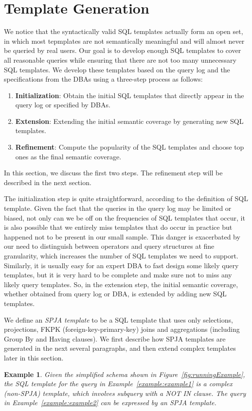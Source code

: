 \documentclass{vldb}
\newtheorem{example}{Example}
\begin{document}
\section{Template Generation}
\label{sec:offline}
We notice that the syntactically valid SQL templates actually form an open set, in which most tepmplates are not semantically meaningful and will almost never be queried by real users.  Our goal is to develop enough SQL templates to cover all reasonable queries while ensuring that there are not too many unnecessary SQL templates.  We develop these templates based on the query log and the specifications from the DBAs using a three-step process as follows: 
\begin{enumerate}  
\item \textbf{Initialization}: Obtain the initial SQL templates that directly appear in the query log or specified by DBAs.  
\item \textbf{Extension}: Extending the initial semantic coverage by generating new SQL templates.  
\item \textbf{Refinement}: Compute the popularity of the SQL templates and choose top ones as the final semantic coverage.\end{enumerate}
In this section, we discuss the first two steps.  The refinement step will be described in the next section.

The initialization step is quite straightforward, according to the definition of SQL template.  Given the fact that the queries in the query log may be limited or biased, not only can we be off on the frequencies of SQL templates that occur, it is also possible that we entirely miss templates that do occur in practice but happened not to be present in our small sample. This danger is exacerbated by our need to distinguish between operators and query structures at fine granularity, which increases the number of SQL templates we need to support. Similarly, it is usually easy for an expert DBA to fast design some likely query templates, but it is very hard to be complete and make sure not to miss any likely query templates.  So, in the extension step, the initial semantic coverage, whether obtained from query log or DBA,  is extended by adding new SQL templates.  

We define an {\em SPJA template} to be a SQL template that uses only selections, projections, FKPK (foreign-key-primary-key)  joins and aggregations (including Group By and Having clauses).  We first describe how SPJA templates are generated in the next several paragraphs, and then extend complex templates later in this section.
\begin{example}
Given the simplified schema shown in Figure~\ref{fig:runningExample}, the SQL template for the query in Example~\ref{example:example1} is a complex (non-SPJA) template, which involves subquery with a NOT IN clause.  The query in Example~\ref{example:example2} can be expressed by an SPJA template.  
\end{example}
\end{document}
